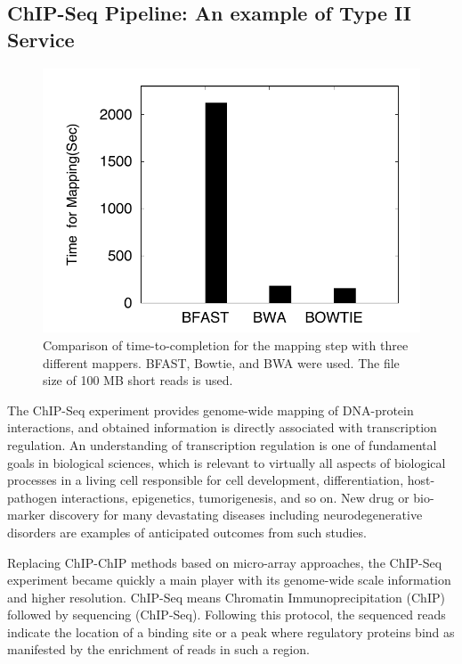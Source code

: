 \documentclass{cpeauth}
\begin{document}
\subsection{ChIP-Seq Pipeline: An example of Type II Service}

\begin{figure}
 \centering
\includegraphics[scale=0.50]{figures/chip-seq-mapper-dependency-ttc.pdf}
\caption{\small Comparison of time-to-completion for the mapping step with three different mappers.  BFAST, Bowtie, and BWA were used. The file size of 100 MB short reads is used.  
}
  \label{fig:chip-seq-comp} 
 \end{figure}
 
 The ChIP-Seq experiment provides genome-wide mapping of DNA-protein
 interactions, and obtained information is directly associated with
 transcription regulation\cite{pepke2009, laajala, wilbanks}.  An
 understanding of transcription regulation is one of fundamental goals
 in biological sciences, which is relevant to virtually all
 aspects of biological processes in a living cell responsible for cell
 development, differentiation, host-pathogen interactions,
 epigenetics, tumorigenesis, and so on.  New drug or bio-marker discovery for
 many devastating diseases including neurodegenerative disorders are
 examples of anticipated outcomes from such studies\cite{pepke2009}.
 
 Replacing ChIP-ChIP methods based on micro-array approaches,
 the ChIP-Seq experiment became quickly a main player with its genome-wide
 scale information and higher resolution\cite{pepke2009,mardis2008-tig}.  ChIP-Seq means Chromatin
 Immunoprecipitation (ChIP) followed by sequencing (ChIP-Seq). Following this protocol, the sequenced reads indicate the location of a binding site or a peak where
 regulatory proteins bind as manifested by the enrichment of reads in such a region.  
 
\end{document}
